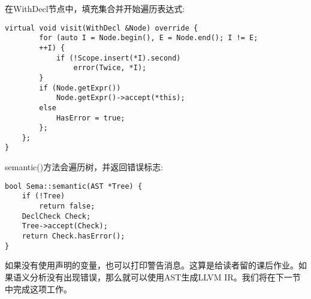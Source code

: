 在WithDecl节点中，填充集合并开始遍历表达式:

\begin{lstlisting}[caption={}]
	virtual void visit(WithDecl &Node) override {
		for (auto I = Node.begin(), E = Node.end(); I != E;
		++I) {
			if (!Scope.insert(*I).second)
				error(Twice, *I);
		}
		if (Node.getExpr())
			Node.getExpr()->accept(*this);
		else
			HasError = true;
		};
	};
}
\end{lstlisting}

semantic()方法会遍历树，并返回错误标志:

\begin{lstlisting}[caption={}]
bool Sema::semantic(AST *Tree) {
	if (!Tree)
		return false;
	DeclCheck Check;
	Tree->accept(Check);
	return Check.hasError();
}
\end{lstlisting}

如果没有使用声明的变量，也可以打印警告消息。这算是给读者留的课后作业。如果语义分析没有出现错误，那么就可以使用AST生成LLVM IR。我们将在下一节中完成这项工作。\par





























